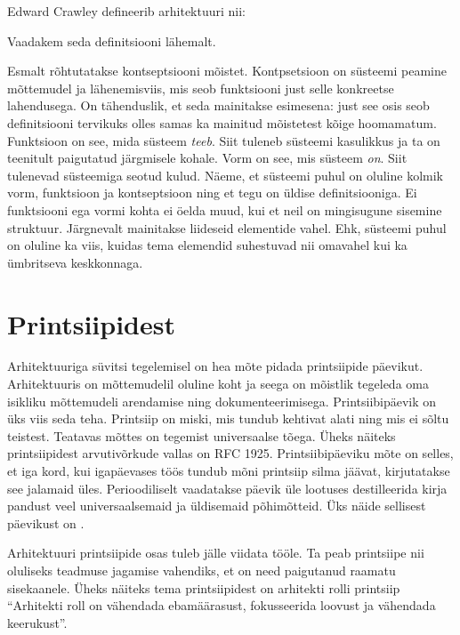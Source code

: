 \documentclass{tufte-book}
\begin{document}
Edward Crawley defineerib arhitektuuri nii:

Vaadakem seda definitsiooni lähemalt. 

Esmalt rõhtutatakse kontseptsiooni mõistet. Kontpsetsioon on süsteemi peamine mõttemudel ja lähenemisviis, mis seob funktsiooni just selle konkreetse lahendusega. On tähenduslik, et seda mainitakse esimesena: just see osis seob definitsiooni tervikuks olles samas ka mainitud mõistetest kõige hoomamatum. Funktsioon on see, mida süsteem \emph{teeb}. Siit tuleneb süsteemi kasulikkus ja ta on teenitult paigutatud järgmisele kohale. Vorm on see, mis süsteem \emph{on}. Siit tulenevad süsteemiga seotud kulud. Näeme, et süsteemi puhul on oluline kolmik vorm, funktsioon ja kontseptsioon ning et tegu on üldise definitsiooniga. Ei funktsiooni ega vormi kohta ei öelda muud, kui et neil on mingisugune sisemine struktuur. Järgnevalt mainitakse liideseid elementide vahel. Ehk, süsteemi puhul on oluline ka viis, kuidas tema elemendid suhestuvad nii omavahel kui ka ümbritseva keskkonnaga.

\section{Printsiipidest}
Arhitektuuriga süvitsi tegelemisel on hea mõte pidada printsiipide päevikut. Arhitektuuris on mõttemudelil oluline koht ja seega on mõistlik tegeleda oma isikliku mõttemudeli arendamise ning dokumenteerimisega. Printsiibipäevik on üks viis seda teha. Printsiip on miski, mis tundub kehtivat alati ning mis ei sõltu teistest. Teatavas mõttes on tegemist universaalse tõega. Üheks näiteks printsiipidest arvutivõrkude vallas on RFC 1925\cite{callon1996rfc}. Printsiibipäeviku mõte on selles, et iga kord, kui igapäevases töös tundub mõni printsiip silma jäävat, kirjutatakse see jalamaid üles. Perioodiliselt vaadatakse päevik üle lootuses destilleerida kirja pandust veel universaalsemaid ja üldisemaid põhimõtteid. Üks näide sellisest päevikust on \cite{archprinciples}. 

Arhitektuuri printsiipide osas tuleb jälle viidata \citeauthor{crawley2015systems} tööle. Ta peab printsiipe nii oluliseks teadmuse jagamise vahendiks, et on need paigutanud raamatu sisekaanele. Üheks näiteks tema printsiipidest on arhitekti rolli printsiip \enquote{Arhitekti roll on vähendada ebamäärasust, fokusseerida loovust ja vähendada keerukust}\cite{crawley2015systems}.
\end{document}
